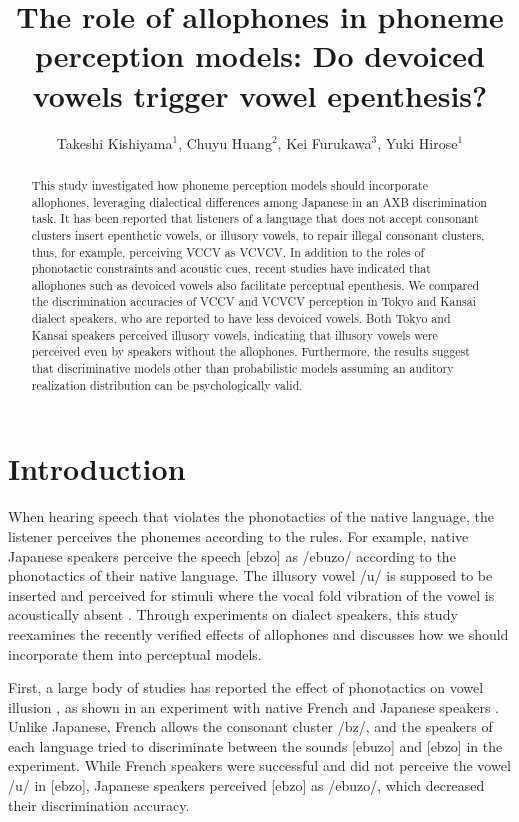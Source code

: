 \documentclass[a4paper,11pt,twocolumn]{article}
\title{The role of allophones in phoneme perception models: Do devoiced vowels trigger vowel epenthesis?}
\author{
    Takeshi Kishiyama$^1$,
    Chuyu Huang$^2$,
    Kei Furukawa$^3$,
    Yuki Hirose$^1$}
\begin{document}
\maketitle

\begin{abstract}
This study investigated how phoneme perception models should incorporate allophones, leveraging dialectical differences among Japanese in an AXB discrimination task. It has been reported that listeners of a language that does not accept consonant clusters insert epenthetic vowels, or illusory vowels, to repair illegal consonant clusters, thus, for example, perceiving VCCV as VCVCV. In addition to the roles of phonotactic constraints and acoustic cues, recent studies have indicated that allophones such as devoiced vowels also facilitate perceptual epenthesis. We compared the discrimination accuracies of VCCV and VCVCV perception in Tokyo and Kansai dialect speakers, who are reported to have less devoiced vowels. Both Tokyo and Kansai speakers perceived illusory vowels, indicating that illusory vowels were perceived even by speakers without the allophones. Furthermore, the results suggest that discriminative models other than probabilistic models assuming an auditory realization distribution can be psychologically valid.
\end{abstract}


\section{Introduction}

When hearing speech that violates the phonotactics of the native language, the listener perceives the phonemes according to the rules. For example, native Japanese speakers perceive the speech [ebzo] as /ebuzo/ according to the phonotactics of their native language. The illusory vowel /u/ is supposed to be inserted and perceived for stimuli where the vocal fold vibration of the vowel is acoustically absent \cite{dupoux1999, dupoux2011}. Through experiments on dialect speakers, this study reexamines the recently verified effects of allophones and discusses how we should incorporate them into perceptual models.

First, a large body of studies has reported the effect of phonotactics on vowel illusion \cite{dupoux1993, korean, spanish, english, and others}, as shown in an experiment with native French and Japanese speakers \cite{dupoux1993}. Unlike Japanese, French allows the consonant cluster /bz/, and the speakers of each language tried to discriminate between the sounds [ebuzo] and [ebzo] in the experiment. While French speakers were successful and did not perceive the vowel /u/ in [ebzo], Japanese speakers perceived [ebzo] as /ebuzo/, which decreased their discrimination accuracy.
\end{document}

